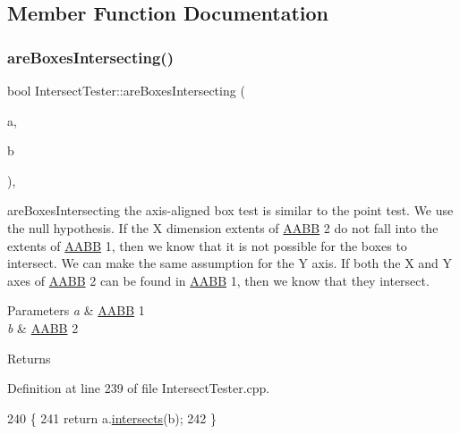 \subsection{Member Function Documentation}
\mbox{\label{class_intersect_tester_aff69bf4a84e714029204496c2efb0b3b}} 
\subsubsection{\texorpdfstring{are\+Boxes\+Intersecting()}{areBoxesIntersecting()}}
{\footnotesize\ttfamily bool Intersect\+Tester\+::are\+Boxes\+Intersecting (\begin{DoxyParamCaption}\item[{\hyperlink{class_a_a_b_b}{A\+A\+BB}}]{a,  }\item[{\hyperlink{class_a_a_b_b}{A\+A\+BB}}]{b }\end{DoxyParamCaption})\hspace{0.3cm}{\ttfamily [static]}, {\ttfamily [private]}}



are\+Boxes\+Intersecting the axis-\/aligned box test is similar to the point test. We use the null hypothesis. If the X dimension extents of \hyperlink{class_a_a_b_b}{A\+A\+BB} 2 do not fall into the extents of \hyperlink{class_a_a_b_b}{A\+A\+BB} 1, then we know that it is not possible for the boxes to intersect. We can make the same assumption for the Y axis. If both the X and Y axes of \hyperlink{class_a_a_b_b}{A\+A\+BB} 2 can be found in \hyperlink{class_a_a_b_b}{A\+A\+BB} 1, then we know that they intersect. 


\begin{DoxyParams}{Parameters}
{\em a} & \hyperlink{class_a_a_b_b}{A\+A\+BB} 1 \\
\hline
{\em b} & \hyperlink{class_a_a_b_b}{A\+A\+BB} 2 \\
\hline
\end{DoxyParams}
\begin{DoxyReturn}{Returns}

\end{DoxyReturn}


Definition at line 239 of file Intersect\+Tester.\+cpp.


\begin{DoxyCode}
240 \{
241     \textcolor{keywordflow}{return} a.\hyperlink{class_a_a_b_b_a62290d3f27644484f2df17c42cd1bfd5}{intersects}(b);
242 \}
\end{DoxyCode}
\mbox{\label{class_intersect_tester_a36c9fcad6ad5607f5a47369aeb2b57c3}} 
